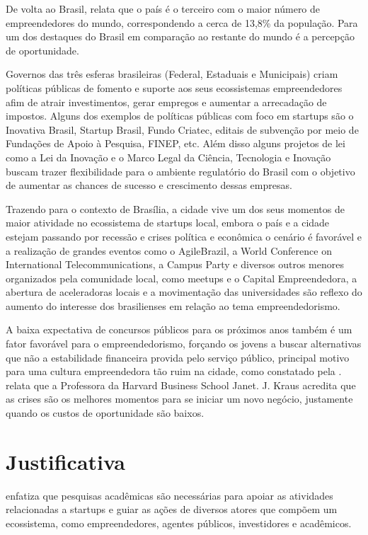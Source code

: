 De volta ao Brasil,  relata que o país é o terceiro com o maior número de empreendedores do mundo, correspondendo a cerca de 13,8\% da população. Para  um dos destaques do Brasil em comparação ao restante do mundo é a percepção de oportunidade.

Governos das três esferas brasileiras (Federal, Estaduais e Municipais) criam políticas públicas de fomento e suporte aos seus ecossistemas empreendedores afim de atrair investimentos, gerar empregos e aumentar a arrecadação de impostos. Alguns dos exemplos de políticas públicas com foco em startups são o Inovativa Brasil, Startup Brasil, Fundo Criatec, editais de subvenção por meio de Fundações de Apoio à Pesquisa, FINEP, etc. Além disso alguns projetos de lei como a Lei da Inovação e o Marco Legal da Ciência, Tecnologia e Inovação buscam trazer flexibilidade para o ambiente regulatório do Brasil com o objetivo de aumentar as chances de sucesso e crescimento dessas empresas.

Trazendo para o contexto de Brasília, a cidade vive um dos seus momentos de maior atividade no ecossistema de startups local, embora o país e a cidade estejam passando por recessão e crises política e econômica o cenário é favorável e a realização de grandes eventos como o AgileBrazil, a World Conference on International Telecommunications, a Campus Party e diversos outros menores organizados pela comunidade local, como meetups e o Capital Empreendedora, a abertura de aceleradoras locais e a movimentação das universidades são reflexo do aumento do interesse dos brasilienses em relação ao tema empreendedorismo. 

A baixa expectativa de concursos públicos para os próximos anos também é um fator favorável para o empreendedorismo, forçando os jovens a buscar alternativas que não a estabilidade financeira provida pelo serviço público, principal motivo para uma cultura empreendedora tão ruim na cidade, como constatado pela .  relata que a Professora da Harvard Business School Janet. J. Kraus acredita que as crises são os melhores momentos para se iniciar um novo negócio, justamente quando os custos de oportunidade são baixos. 

\section{Justificativa}
\label{section:justificativa}

 enfatiza que pesquisas acadêmicas são necessárias para apoiar as atividades relacionadas a startups e guiar as ações de diversos atores que compõem um ecossistema, como empreendedores, agentes públicos, investidores e acadêmicos.

